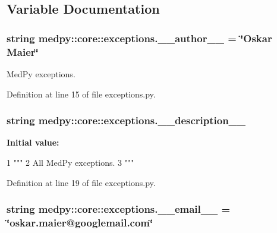 \subsection{Variable Documentation}
\hypertarget{namespacemedpy_1_1core_1_1exceptions_a5599a8a054f06dfd6bd0f44ffbf6d522}{
\subsubsection[{\_\-\_\-author\_\-\_\-}]{\setlength{\rightskip}{0pt plus 5cm}string {\bf medpy::core::exceptions.\_\-\_\-author\_\-\_\-} = \char`\"{}Oskar Maier\char`\"{}}}
\label{namespacemedpy_1_1core_1_1exceptions_a5599a8a054f06dfd6bd0f44ffbf6d522}


MedPy exceptions. 



Definition at line 15 of file exceptions.py.

\hypertarget{namespacemedpy_1_1core_1_1exceptions_a9db40ab8020b9943fe61ac5e252f2b61}{
\subsubsection[{\_\-\_\-description\_\-\_\-}]{\setlength{\rightskip}{0pt plus 5cm}string {\bf medpy::core::exceptions.\_\-\_\-description\_\-\_\-}}}
\label{namespacemedpy_1_1core_1_1exceptions_a9db40ab8020b9943fe61ac5e252f2b61}
{\bfseries Initial value:}
\begin{DoxyCode}
1 """
2                   All MedPy exceptions.
3                   """
\end{DoxyCode}


Definition at line 19 of file exceptions.py.

\hypertarget{namespacemedpy_1_1core_1_1exceptions_a6000fcb2687e2b3171c593295d651f2e}{
\subsubsection[{\_\-\_\-email\_\-\_\-}]{\setlength{\rightskip}{0pt plus 5cm}string {\bf medpy::core::exceptions.\_\-\_\-email\_\-\_\-} = \char`\"{}oskar.maier@googlemail.com\char`\"{}}}
\label{namespacemedpy_1_1core_1_1exceptions_a6000fcb2687e2b3171c593295d651f2e}


